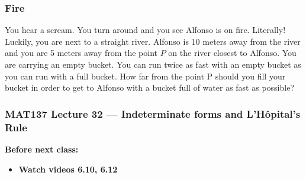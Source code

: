 \documentclass[14pt]{beamer}
\begin{document}
	\begin{frame}[t]
		\frametitle{Fire}

		You hear a scream. You turn around and you see Alfonso is on fire. Literally!
		Luckily, you are next to a straight river. Alfonso is 10 meters away from the
		river and you are 5 meters away from the point $P$ on the river closest to Alfonso.
		You are carrying an empty bucket. You can run twice as fast with an empty bucket
		as you can run with a full bucket. How far from the point P should you fill
		your bucket in order to get to Alfonso with a bucket full of water as fast
		as possible?

	\end{frame}













\begin{frame}
	\frametitle{MAT137 Lecture 32 --- Indeterminate forms and L'H\^opital's Rule}

	\vfill
	{\bf Before next class:}
		\begin{itemize} \normalsize
			\item {\bf Watch videos 6.10, 6.12}
		\end{itemize}
\end{frame}
\end{document}
